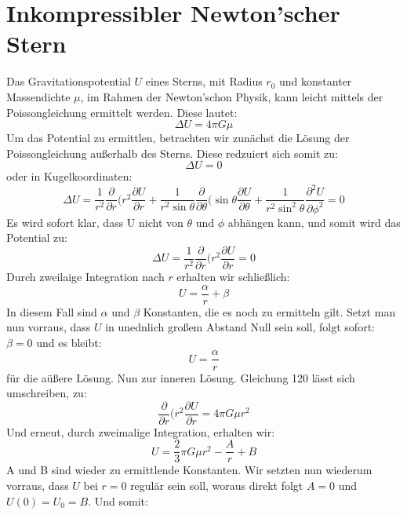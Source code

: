 \documentclass[a4paper]{article}
\begin{document}
\section{Inkompressibler Newton'scher Stern}
Das Gravitationspotential $U$ eines Sterns, mit Radius $r_0$ und konstanter Massendichte $\mu$, im Rahmen der Newton'schon Physik, kann leicht mittels der Poissongleichung ermittelt werden. Diese lautet:
\begin{equation}
    \Delta U=4\pi G\mu
\end{equation}
Um das Potential zu ermittlen, betrachten wir zunächst die Lösung der Poissongleichung außerhalb des Sterns. Diese redzuiert sich somit zu:
\begin{equation}
    \Delta U=0
\end{equation}
oder in Kugelkoordinaten:
\begin{equation}
    \Delta U=\frac{1}{r^2}\frac{\partial}{\partial r}(r^2\frac{\partial U}{\partial r}+\frac{1}{r^2\sin{\theta}}\frac{\partial}{\partial\theta}(\sin{\theta}\frac{\partial U}{\partial\theta}+\frac{1}{r^2\sin^2{\theta}}\frac{\partial^2U}{\partial\phi^2}=0
\end{equation}
Es wird sofort klar, dass U nicht von $\theta$ und $\phi$ abhängen kann, und somit wird das Potential zu:
\begin{equation}
    \Delta U=\frac{1}{r^2}\frac{\partial}{\partial r}(r^2\frac{\partial U}{\partial r}=0
\end{equation}
Durch zweilaige Integration nach $r$ erhalten wir schließlich:
\begin{equation}
    U=\frac{\alpha}{r}+\beta
\end{equation}
In diesem Fall sind $\alpha$ und $\beta$ Konstanten, die es noch zu ermitteln gilt. Setzt man nun vorraus, dass $U$ in unednlich großem Abstand Null sein soll, folgt sofort: $\beta=0$ und es bleibt:
\begin{equation}
    U=\frac{\alpha}{r}
\end{equation}
für die aüßere Lösung.
\newline
Nun zur inneren Lösung.
Gleichung 120 lässt sich umschreiben, zu:
\begin{equation}
    \frac{\partial}{\partial r}(r^2\frac{\partial U}{\partial r}=4\pi G\mu r^2
\end{equation}
Und erneut, durch zweimalige Integration, erhalten wir:
\begin{equation}
    U=\frac{2}{3}\pi G\mu r^2-\frac{A}{r}+B
\end{equation}
A und B sind wieder zu ermittlende Konstanten. Wir setzten nun wiederum vorraus, dass $U$ bei $r=0$ regulär sein soll, woraus direkt folgt $A=0$ und $U(0)=U_0=B$. Und somit:
\end{document}

